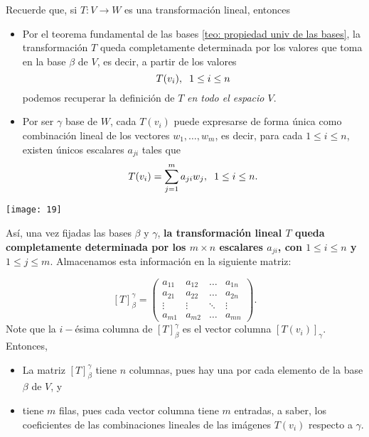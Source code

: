 Recuerde que, si $T: V \longrightarrow W$ es una transformación lineal,
entonces
\begin{itemize}
	\item Por el teorema fundamental de las bases 
	\ref{teo: propiedad univ de las bases}, 
	la transformación $T$ queda completamente
	determinada por los valores que toma en la base $\beta$ de $V$,
	es decir, a partir de los valores
	\[
	T(v_{i}), \hspace{0.2cm} 1 \leq i \leq n
	\]
	podemos recuperar la definición de $T$ \textit{en todo el espacio
	$V$}.
	\item Por ser $\gamma$ base de $W$, cada $T(v_{i})$ puede
	expresarse de forma única como combinación lineal de 
	los vectores $w_{1}, \ldots, w_{m}$, es decir,
	para cada $1 \leq i \leq n$, existen únicos escalares
	$a_{ji}$ tales que
	\begin{equation}
		\label{eq: 24 oct, 1}
	T(v_{i}) = \sum_{j = 1}^{m} a_{ji} w_{j}, 
	\hspace{0.2cm} 1 \leq i \leq n.
	\end{equation}
\end{itemize}
\begin{marginfigure}
\texttt{[image: 19]} 
\end{marginfigure}
Así, una vez fijadas las bases $\beta$ y $\gamma$, 
\textbf{la transformación lineal $T$ queda completamente determinada
por los $m \times n$ escalares $a_{ji}$, con $1 \leq i \leq n$ y
$1 \leq j \leq m$}. Almacenamos esta información en la siguiente
matriz:

\begin{equation}
	\label{eq: representacion matricial T}
	[T]_{\beta}^{\gamma} = 
	\begin{pmatrix}
	a_{11} & a_{12} & \ldots & a_{1n} \\
	a_{21} & a_{22} & \ldots & a_{2n} \\
	\vdots & \vdots & \ddots & \vdots \\
	a_{m1} & a_{m2} & \ldots & a_{mn} 
	\end{pmatrix}.
\end{equation}
Note que la $i-$ésima columna de $[T]_{\beta}^{\gamma}$
es el vector columna $[T(v_{i})]_{\gamma}$. Entonces,
\begin{itemize}
	\item La matriz $[T]_{\beta}^{\gamma}$ tiene $n$ columnas,
	pues hay una por cada elemento de la base $\beta$ de $V$, y
	\item tiene $m$ filas, pues cada vector columna tiene $m$ 
	entradas, a saber, los coeficientes de las combinaciones
	lineales de las imágenes $T(v_{i})$ respecto a $\gamma$.
\end{itemize}

